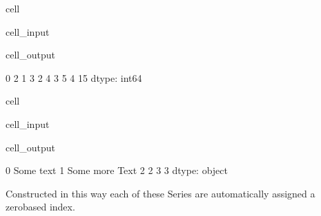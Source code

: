 \documentclass[letterpaper,10pt,english]{jupyterBook}
\begin{document}
\begin{sphinxuseclass}{cell}\begin{sphinxVerbatimInput}

\begin{sphinxuseclass}{cell_input}
\begin{sphinxVerbatim}[commandchars=\\\{\}]
\end{sphinxVerbatim}

\end{sphinxuseclass}\end{sphinxVerbatimInput}
\begin{sphinxVerbatimOutput}

\begin{sphinxuseclass}{cell_output}
\begin{sphinxVerbatim}[commandchars=\\\{\}]
0     2
1     3
2     4
3     5
4   \PYGZhy{}15
dtype: int64
\end{sphinxVerbatim}

\end{sphinxuseclass}\end{sphinxVerbatimOutput}

\end{sphinxuseclass}
\begin{sphinxuseclass}{cell}\begin{sphinxVerbatimInput}

\begin{sphinxuseclass}{cell_input}
\begin{sphinxVerbatim}[commandchars=\\\{\}]
\end{sphinxVerbatim}

\end{sphinxuseclass}\end{sphinxVerbatimInput}
\begin{sphinxVerbatimOutput}

\begin{sphinxuseclass}{cell_output}
\begin{sphinxVerbatim}[commandchars=\\\{\}]
0         Some text
1    Some more Text
2                 2
3                 3
dtype: object
\end{sphinxVerbatim}

\end{sphinxuseclass}\end{sphinxVerbatimOutput}

\end{sphinxuseclass}
\sphinxAtStartPar
Constructed in this way each of these Series are automatically assigned a zero\sphinxhyphen{}based index.
\end{document}
